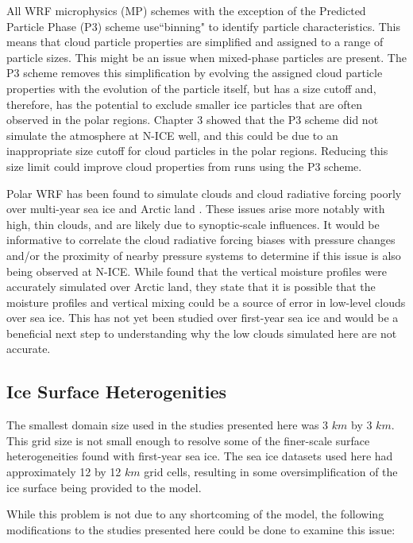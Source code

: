All WRF microphysics (MP) schemes with the exception of the Predicted Particle Phase (P3) scheme use``binning" to identify particle characteristics. This means that cloud particle properties are simplified and assigned to a range of particle sizes. This might be an issue when mixed-phase particles are present. The P3 scheme removes this simplification by evolving the assigned cloud particle properties with the evolution of the particle itself, but has a size cutoff and, therefore, has the potential to exclude smaller ice particles that are often observed in the polar regions. Chapter 3 showed that the P3 scheme did not simulate the atmosphere at N-ICE well, and this could be due to an inappropriate size cutoff for cloud particles in the polar regions. Reducing this size limit could improve cloud properties from runs using the P3 scheme.

Polar WRF has been found to simulate clouds and cloud radiative forcing poorly over multi-year sea ice and Arctic land \citep{hines:2011}. These issues arise more notably with high, thin clouds, and are likely due to synoptic-scale influences. It would be informative to correlate the cloud radiative forcing biases with pressure changes and/or the proximity of nearby pressure systems to determine if this issue is also being observed at N-ICE. While \citet{hines:2011, hines:2008} found that the vertical moisture profiles were accurately simulated over Arctic land, they state that it is possible that the moisture profiles and vertical mixing could be a source of error in low-level clouds over sea ice. This has not yet been studied over first-year sea ice and would be a beneficial next step to understanding why the low clouds simulated here are not accurate.

\subsection{Ice Surface Heterogenities}
The smallest domain size used in the studies presented here was 3 $km$ by 3 $km$. This grid size is not small enough to resolve some of the finer-scale surface heterogeneities found with first-year sea ice. The sea ice datasets used here had approximately 12 by 12 $km$ grid cells, resulting in some oversimplification of the ice surface being provided to the model. 

While this problem is not due to any shortcoming of the model, the following modifications to the studies presented here could be done to examine this issue:

